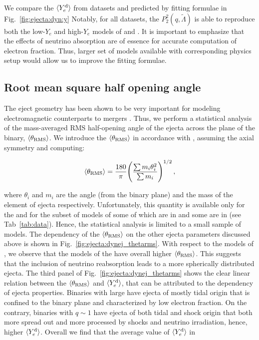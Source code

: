 We compare the $\langle Y^{\text{d}}_{e}\rangle$ from datasets and predicted by fitting formulae in Fig.~\ref{fig:ejecta:dyn:y} 
Notably, for all datasets, the $P_2^2(q,\tilde\Lambda)$ is able to reproduce both the 
low-$Y_e$ and high-$Y_e$ models of \DSheatcool{} and \DSrefset{}.
It is important to emphasize that the effects of neutrino absorption are of essence for accurate
computation of electron fraction. Thus, larger set of models available with corresponding physics 
setup would allow us to improve the fitting formulae.


\subsection{Root mean square half opening angle} 

The eject geometry has been shown to be very important for modeling electromagnetic counterparts 
to mergers \citep[\eg][]{Perego:2017wtu}. 
Thus, we perform a statistical analysis of the mass-averaged \ac{RMS} half-opening angle of the 
ejecta across the plane of the binary, $\langle\theta_{\rm RMS}\rangle$.
We introduce the $\langle\theta_{\rm RMS}\rangle$ in accordance with \citet{Radice:2018pdn}, assuming the axial symmetry
and computing:

\begin{equation}
\langle\theta_{\rm RMS}\rangle = \frac{180}{\pi}\Bigg(\frac{\sum m_i \theta_i^2}{\sum m_i}\Bigg)^{1/2}\, ,
\end{equation}

where $\theta_i$ and $m_i$ are the angle (from the binary plane) and the mass of the element 
of ejecta respectively.
Unfortunately, this quantity is available only for the \DSrefset{} and for the subset of models 
of \citet{Radice:2018pdn} some of which are in \DScool{} and some are in \DSheatcool{} 
(see Tab~\ref{tab:data}). Hence, the statistical analysis is limited to a small sample of models.
The dependency of the $\langle\theta_{\rm RMS}\rangle$ on the other ejecta parameters discussed above is 
shown in Fig.~\ref{fig:ejecta:dynej_thetarms}.
With respect to the models of \citet{Radice:2018pdn}, we observe that the models of the \DSrefset{}
have overall higher $\langle\theta_{\rm RMS}\rangle$. This suggests that the inclusion of neutrino reabsorption 
leads to a more spherically distributed ejecta.
The third panel of Fig.~\ref{fig:ejecta:dynej_thetarms} shows the clear linear relation between
the $\langle\theta_{\rm RMS}\rangle$ and $\langle Y^{\text{d}}_{e}\rangle$, that can be attributed to the \mr{} dependency of ejecta properties. 
Binaries with large \mr{} have ejecta of mostly tidal origin that is confined to the binary plane 
and characterized by low electron fraction. On the contrary, binaries with $q\sim 1$ have ejecta 
of both tidal and shock origin that both more spread out and more processed by shocks and neutrino 
irradiation, hence, higher $\langle Y^{\text{d}}_{e}\rangle$.
Overall we find that the average value of $\langle Y^{\text{d}}_{e}\rangle$ in \DSrefset{}

